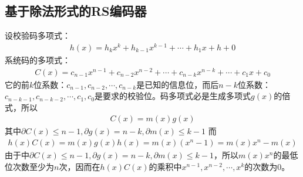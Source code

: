 \subsection{基于除法形式的RS编码器}
设校验码多项式：
\begin{eqnarray}
  h(x)=h_kx^k+h_{k-1}x^{k-1}+\cdots +h_1x+h+0
  \label{equ:4.3}
\end{eqnarray}
系统码的多项式：
\begin{eqnarray} 
  C(x)=c_{n-1}x^{n-1}+c_{n-2}x^{n-2}+\cdots +c_{n-k}x^{n-k}+\cdots +c_1x+c_0
  \label{equ:4.4}
\end{eqnarray}
它的前$k$位系数：$c_{n-1},c_{n-2},\cdots
,c_{n-k}$是已知的信息位，而后$n-k$位系数：$c_{n-k-1},c_{n-k-2},\cdots
,c_1,c_0$是要求的校验位。码多项式必是生成多项式$g(x)$的倍式，所以
\begin{eqnarray}
  C(x)=m(x)g(x)
  \label{equ:4.5}
\end{eqnarray}
其中$\partial C(x)\le n-1,\partial g(x)=n-k,\partial m(x)\le k-1$
而
\begin{eqnarray}
  h(x)C(x)=m(x)g(x)h(x)=m(x)(x^n-1)=m(x)x^n-m(x)
  \label{equ:4.6}
\end{eqnarray}
由于中$\partial C(x)\le n-1,\partial g(x)=n-k,\partial m(x)\le
k-1$，所以$m(x)x^n$的最低位次数至少为$n$次，因而在$h(x)C(x)$的乘积中$x^{n-1},x^{n-2},\cdots
,x^k$的次数为0。

